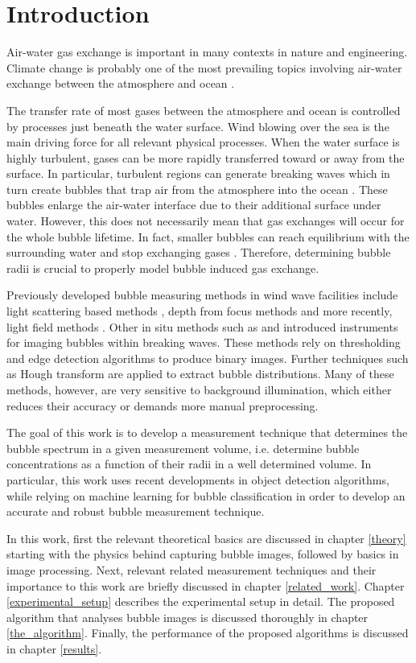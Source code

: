 \chapter{Introduction}
	Air-water gas exchange is important in many contexts in nature and engineering. Climate change is probably one of the most prevailing topics involving air-water exchange between the atmosphere and ocean \citep{MischlerDiss}.
	
	The transfer rate of most gases between the atmosphere and ocean is controlled by processes just beneath the water surface. Wind blowing over the sea is the main driving force for all relevant physical processes. 
	When the water surface is highly turbulent, gases can be more rapidly transferred toward or away from the surface. In particular, turbulent regions can generate breaking waves which in turn create bubbles that trap air from the atmosphere into the ocean \citep{Terry}. These bubbles enlarge the air-water interface due to their additional surface under water. However, this does not necessarily mean that gas exchanges will occur for the whole bubble lifetime. In fact, smaller bubbles can reach equilibrium with the surrounding water and stop exchanging gases \citep{MischlerDiss}. Therefore, determining bubble radii is crucial to properly model bubble induced gas exchange.
	
	Previously developed bubble measuring methods in wind wave facilities include light scattering based methods \citep{jaehne1984}, depth from focus methods \citep{geissler_1995} and more recently, light field methods \citep{MischlerDiss}. Other in situ methods such as \citet{Al-Lashi2016} and \citet{Leifer2003} introduced instruments for imaging bubbles within breaking waves. These methods rely on thresholding and edge detection algorithms to produce binary images. Further techniques such as Hough transform \citep{Hough1972} are applied to extract bubble distributions. Many of these methods, however, are very sensitive to background illumination, which either reduces their accuracy \citep{Zhong2016} or demands more manual preprocessing.  
	
	The goal of this work is to develop a measurement technique that determines the bubble spectrum in a given measurement volume, i.e. determine bubble concentrations as a function of their radii in a well determined volume. In particular, this work uses recent developments in object detection algorithms, while relying on machine learning for bubble classification in order to develop an accurate and robust bubble measurement technique. 
	
	In this work, first the relevant theoretical basics are discussed in chapter \ref{theory} starting with the physics behind capturing bubble images, followed by basics in image processing. Next, relevant related measurement techniques and their importance to this work are briefly discussed in chapter \ref{related_work}. Chapter \ref{experimental_setup} describes the experimental setup in detail. The proposed algorithm that analyses bubble images is discussed thoroughly in chapter \ref{the_algorithm}. Finally, the performance of the proposed algorithms is discussed in chapter \ref{results}.